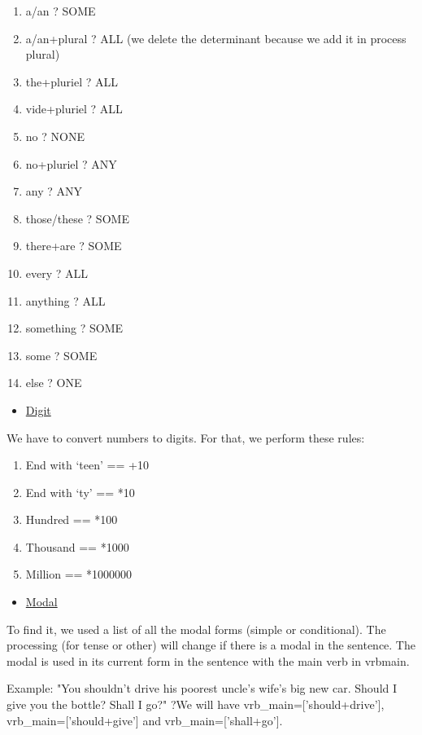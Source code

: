 \documentclass[twoside,a4paper,10pt]{report}
\begin{document}
\begin{enumerate}    \item  a/an ? SOME
    \item  a/an+plural ? ALL (we delete the determinant because we add it in process plural)
    \item  the+pluriel ? ALL
    \item  vide+pluriel ? ALL
    \item  no ? NONE
    \item  no+pluriel ? ANY
    \item  any ? ANY
    \item  those/these ? SOME
    \item  there+are ? SOME
    \item  every ? ALL
    \item  anything ? ALL
    \item  something ? SOME
    \item  some ? SOME
    \item  else ? ONE
\end{enumerate}

\begin{itemize}
    \item  \underline{Digit}
\end{itemize}
We have to convert numbers to digits. For that, we perform these rules:


\begin{enumerate}    \item  End with ‘teen’ == +10
    \item  End with ‘ty’   == *10
    \item  Hundred         == *100
    \item  Thousand        == *1000
    \item  Million         == *1000000
\end{enumerate}

\begin{itemize}
    \item  \underline{Modal}
\end{itemize}
To find it, we used a list of all the modal forms (simple or conditional).
The processing (for tense or other) will change if there is a modal in the sentence. The modal is used in its current form in the sentence with the main verb in vrb{\textunderscore}main.


\small
\begin{verbatimtab}
  Example: "You shouldn't drive his poorest uncle's wife's big new car. Should I give you the
bottle? Shall I go?"
  ?We will have vrb_main=['should+drive'], vrb_main=['should+give'] and vrb_main=['shall+go'].
\end{verbatimtab}
\normalsize
\end{document}
